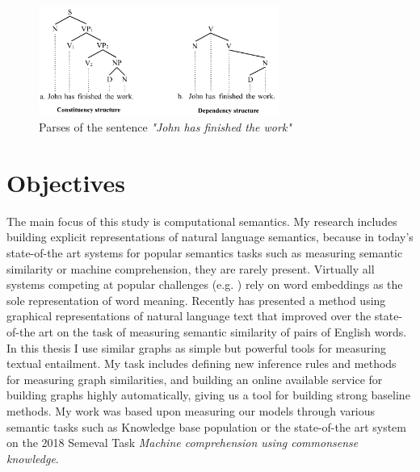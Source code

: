 \begin{figure}[h!]
	\centering
	\includegraphics[width=0.7\textwidth]{figures/Johnhasfinishedthework}
	\caption{Parses of the sentence \textit{"John has finished the work"} \cite{parsers}}
	\label{fig:johnfinished}
\end{figure}
\section{Objectives}
The main focus of this study is computational semantics. My research includes building explicit representations of natural language semantics, because in today's state-of-the art systems for popular semantics tasks such as measuring semantic similarity or machine comprehension, they are rarely present. Virtually all systems
competing at popular challenges (e.g. \cite{Cer:2017,Collados:2017}) rely on word embeddings as the sole representation of word meaning. Recently \cite{Recski:2016c} has presented a method using graphical representations of natural language text that improved over the state-of-the art on the task of
measuring semantic similarity of pairs of English words. In this thesis
I use similar graphs as simple but powerful tools for measuring textual
entailment. My task includes defining new inference rules and methods for measuring graph similarities, and building an online available service for building graphs highly automatically, giving us a tool for building strong baseline methods. My work was based upon measuring our models through various semantic tasks such as Knowledge base population or the state-of-the art system on the 2018 Semeval Task \textit{Machine comprehension using commonsense knowledge}.

